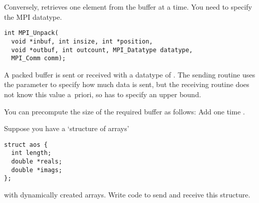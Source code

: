 Conversely,  retrieves one element
from the buffer at a time. You need to specify the MPI datatype.
\begin{lstlisting}
int MPI_Unpack(
  void *inbuf, int insize, int *position,
  void *outbuf, int outcount, MPI_Datatype datatype,
  MPI_Comm comm);
\end{lstlisting}

A packed buffer is sent or received with a datatype of
. The sending routine uses the 
parameter to specify how much data is sent, but the receiving routine
does not know this value a~priori, so has to specify an upper bound.


You can precompute the size of the required buffer as follows:
%
%
Add one time .

\begin{exercise}
  \label{ex:packAOS}
  Suppose you have a `structure of arrays'
\begin{lstlisting}
struct aos {
  int length;
  double *reals;
  double *imags;
};
\end{lstlisting}
  with dynamically created arrays. Write code to send and receive this
  structure.
\end{exercise}
